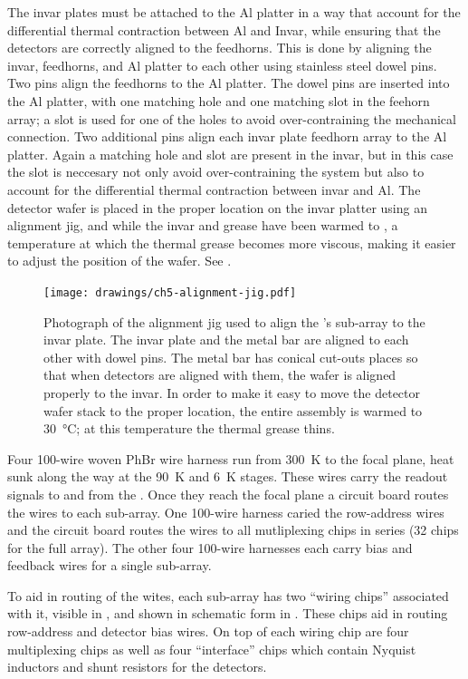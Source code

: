 The invar plates must be attached to the Al platter in a way that account for the differential thermal contraction between Al and Invar, while ensuring that the detectors are correctly aligned to the feedhorns.
This is done by aligning the invar, feedhorns, and Al platter to each other using stainless steel dowel pins.
Two pins align the feedhorns to the Al platter.
The dowel pins are inserted into the Al platter, with one matching hole and one matching slot in the feehorn array; a slot is used for one of the holes to avoid over-contraining the mechanical connection.
Two additional pins align each invar plate feedhorn array to the Al platter.
Again a matching hole and slot are present in the invar, but in this case the slot is neccesary not only avoid over-contraining the system but also to account for the differential thermal contraction between invar and Al.
The detector wafer is placed in the proper location on the invar platter using an alignment jig, and while the invar and grease have been warmed to , a temperature at which the thermal grease becomes more viscous, making it easier to adjust the position of the wafer.
See .

\begin{figure}
\centering
\texttt{[image: drawings/ch5-alignment-jig.pdf]}
\caption[Alignment jig]{
  Photograph of the alignment jig used to align the \Imager's sub-array to the invar plate.
  The invar plate and the metal bar are aligned to each other with dowel pins.
  The metal bar has conical cut-outs places so that when detectors are aligned with them, the wafer is aligned properly to the invar.
  In order to make it easy to move the detector wafer stack to the proper location, the entire assembly is warmed to \SI{30}{\celsius}; at this temperature the thermal grease thins.
}
\label{fig:ch5-alignment-jig}
\end{figure}

Four 100-wire woven PhBr wire harness run from \SI{300}{\K} to the focal plane, heat sunk along the way at the \SI{90}{\K} and \SI{6}{\K} stages.
These wires carry the readout signals to and from the \MCE.
Once they reach the focal plane a circuit board routes the wires to each sub-array.
One 100-wire harness caried the row-address wires and the circuit board routes the wires to all mutliplexing chips in series (32 chips for the full array).
The other four 100-wire harnesses each carry \SQUID bias and feedback wires for a single sub-array.

To aid in routing of the wites, each sub-array has two ``wiring chips'' associated with it, visible in , and shown in schematic form in .
These chips aid in routing row-address and detector bias wires.
On top of each wiring chip are four multiplexing chips as well as four ``interface'' chips which contain Nyquist inductors and shunt resistors for the detectors.

